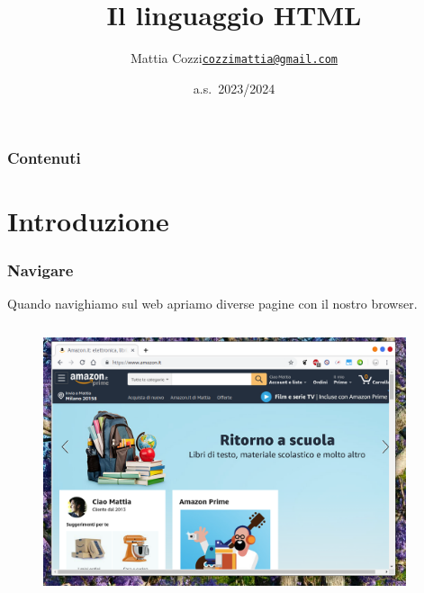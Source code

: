 \documentclass[]{beamer}
\title{Il linguaggio HTML}
\author{\texorpdfstring{Mattia Cozzi\newline\href{mailto:cozzimattia@gmail.com}{\texttt{cozzimattia@gmail.com}}}{Mattia Cozzi}}
\date{a.s.~2023/2024}
\begin{document}
\begin{frame}
  \titlepage
\end{frame}


\begin{frame}
\frametitle{Contenuti}
\tableofcontents
\end{frame}

\section{Introduzione}


\begin{frame}
\frametitle{Navigare}
Quando navighiamo sul web apriamo diverse \alert<1-3>{pagine} con il nostro browser.

\begin{columns}
\begin{column}{0.5\textwidth}
\begin{figure}
\includegraphics[width=\columnwidth]{screenshots/chrome.png}
\end{figure}
\end{column}
\begin{column}{0.2\textwidth}
\end{column}
\end{columns}
\end{frame}
\end{document}
